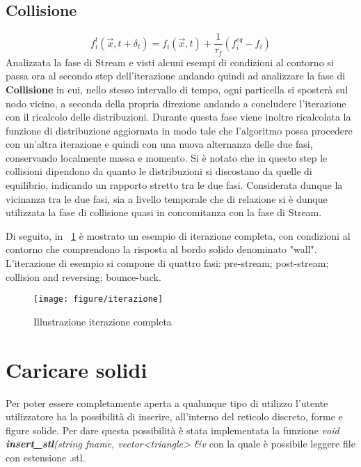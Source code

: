 {\subsection{Collisione}

$$ f_{i}^{t}({\vec {x}},t+\delta _{t})=f_{i}({\vec {x}},t)+{\frac {1}{\tau _{f}}}(f_{i}^{eq}-f_{i})$$
Analizzata la fase di Stream e visti alcuni esempi di condizioni al contorno si passa ora al secondo step dell'iterazione andando quindi ad analizzare la fase di \textbf{Collisione} in cui, nello stesso intervallo di tempo, ogni particella si sposter\`a sul nodo vicino, a seconda della propria direzione andando a concludere l'iterazione con il ricalcolo delle distribuzioni. Durante questa fase viene inoltre ricalcolata la funzione di distribuzione aggiornata in modo tale che l'algoritmo possa procedere con un'altra iterazione e quindi con una nuova alternanza delle due fasi, conservando localmente massa e momento. Si \`e notato che in questo step le collisioni dipendono da quanto le distribuzioni si discostano da quelle di equilibrio, indicando un rapporto stretto tra le due fasi. Considerata dunque la vicinanza tra le due fasi, sia a livello temporale che di relazione si \`e dunque utilizzata la fase di collisione quasi in concomitanza con la fase di Stream.

Di seguito, in \figurename~\ref{fig:iterazione} \`e mostrato un esempio di iterazione completa, con condizioni al contorno che comprendono la risposta al bordo solido denominato "wall". L'iterazione di esempio si compone di quattro fasi: pre-stream; post-stream; collision and reversing; bounce-back.

\begin{figure}[!htb]
	\begin{center}
		\texttt{[image: figure/iterazione]}
	\end{center}
	\caption{Illustrazione iterazione completa \label{fig:iterazione}}
\end{figure}\hfill

\section{Caricare solidi}
Per poter essere completamente aperta a qualunque tipo di utilizzo l'utente utilizzatore ha la possibilit\`a di inserire, all'interno del reticolo discreto, forme e figure solide. Per dare questa possibilit\`a \`e stata implementata la funzione \textit{void \textbf{insert\_stl}(string fname, vector<triangle> \&v} con la quale \`e possibile leggere file con estensione .stl.

}

